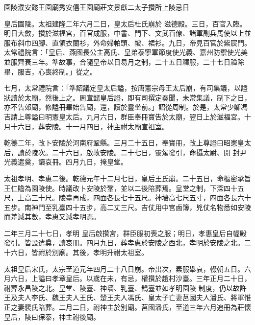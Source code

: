
\begin{pinyinscope}

 園陵濮安懿王園廟秀安僖王園廟莊文景獻二太子攢所上陵忌日



 皇后園陵。太祖建隆二年六月二日，皇太后杜氏崩於
 滋德殿。三日，百官入臨。明日大斂，攢於滋福宮，百官成服，中書、門下、文武百僚、諸軍副兵馬使以上並服布斜巾四腳、直領衣蘭衫，外命婦帕頭、帔、裙衫。九日，帝見百官於紫宸門。太常禮院言：「皇后、燕國長公主高氏、皇弟泰寧軍節度使光義、嘉州防禦使光美並服齊衰三年。準故事，合隨皇帝以日易月之制，二十五日釋服，二十七日禫除畢，服吉，心喪終制。」從之。



 七月，太常禮院言：「準詔議定皇太后謚，按唐憲宗母王太后崩，有司集議，以謚
 狀讀於太廟，然後上之。周宣懿皇后謚，即有司撰定奏聞，未常集議，制下之日，亦不告郊廟，修謚冊畢始告廟，還，讀於靈坐前。」詔從周制。於是，太常少卿馮吉請上尊謚曰明憲皇太后。九月六日，群臣奉冊寶告於太廟，翌日上於滋福宮。十月十六日，葬安陵。十一月四日，神主祔太廟宣祖室。



 乾德二年，改卜安陵於河南府鞏縣。三月二十五日，奉寶冊，改上尊謚曰昭憲皇太后，讀於陵次。二十六日，啟故安陵。二十七日，靈駕發引，命攝太尉、開
 封尹光義遣奠，讀哀冊。四月九日，掩皇堂。



 太祖孝明、孝惠二後。乾德元年十二月七日，皇后王氏崩。二十五日，命樞密承旨王仁贍為園陵使。時議改卜安陵於鞏，並以二後陪葬焉。皇堂之制，下深四十五尺，上高三十尺。陵臺再成，四面各長七十五尺。神墻高七尺五寸，四面各長六十五步。南神門至乳臺四十五步，高二丈三尺。吉仗用中宮鹵簿，兇仗名物悉如安陵而差減其數，孝惠又減孝明焉。



 二年三月二十七日，孝明
 皇后啟攢宮，群臣服初喪之服；明日，孝惠皇后自幄殿發引。皆設遣奠，讀哀冊。四月九日，葬孝惠於安陵之西北，孝明於安陵之北。二十六日，皆祔於別廟。其後，孝明升祔太祖室。



 太祖皇后宋氏，太宗至道元年四月二十八日崩。帝出次，素服舉哀，輟朝五日。六月六日，上謚曰孝章皇后。以歲在未，有忌，權攢於趙村沙臺。三年正月二十日，祔葬永昌陵之北。皇堂、陵臺、神墻、乳臺、鵲臺並如孝明園陵
 制度，仍以故許王及夫人李氏、魏王夫人王氏、楚王夫人馮氏、皇太子亡妻莒國夫人潘氏、將軍惟正之妻裴氏陪葬。二月二日，祔神主於別廟。莒國潘氏，至道三年六月追冊為莊懷皇后，陵曰保泰，神主祔後廟。




\end{pinyinscope}
